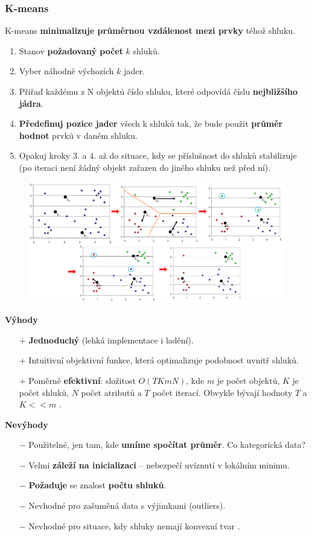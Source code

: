 \subsubsection{K-means}
K-means \textbf{minimalizuje průměrnou vzdálenost mezi prvky} téhož shluku.
\begin{enumerate}
\item Stanov \textbf{požadovaný počet} $ k $ shluků.
\item Vyber náhodně výchozích $ k $ jader.
\item Přiřaď každému z N objektů číslo shluku, které odpovídá číslu \textbf{nejbližšího jádra}.
\item \textbf{Předefinuj pozice jader} všech k shluků tak, že bude použit \textbf{průměr hodnot} prvků v daném shluku.
\item Opakuj kroky 3. a 4. až do situace, kdy se příslušnost do shluků stabilizuje (po iteraci není žádný objekt zařazen do jiného shluku než před ní). 
\end{enumerate}

\begin{figure}[H]
	\centering
	\includegraphics[width=\textwidth]{assets/10_kmeans}
\end{figure}

\noindent\textbf{Výhody}
\begin{itemize}
\item[$+$] \textbf{Jednoduchý} (lehká implementace i ladění).
\item[$+$] Intuitivní objektivní funkce, která optimalizuje podobnost uvnitř shluků.
\item[$+$] Poměrně \textbf{efektivní}: složitost $ O(T  K  m N) $, kde $ m $ je počet objektů, $ K $ je počet shluků, $ N $ počet atributů a $ T $ počet iterací. Obvykle bývají hodnoty $ T$ a $ K << m $ . 
\end{itemize}
\textbf{Nevýhody}
\begin{itemize}
\item[$-$] Použitelné, jen tam, kde \textbf{umíme spočítat průměr}. Co kategorická data?
\item[$-$] Velmi \textbf{záleží na inicializaci} – nebezpečí uvíznutí v lokálním minimu.
\item[$-$] \textbf{Požaduje} se znalost \textbf{počtu shluků}. 
\item[$-$] Nevhodné pro zašuměná data s výjimkami (outliers). 
\item[$-$] Nevhodné pro situace, kdy shluky nemají konvexní tvar .
\end{itemize}

